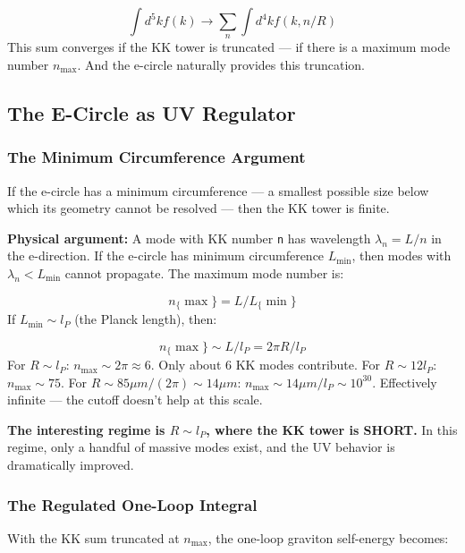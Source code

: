 \documentclass[aps,prd,preprint,superscriptaddress,longbibliography,floatfix]{revtex4-2}
\theoremstyle{remark}
\begin{document}
\begin{equation}
    \int d^{5}k f(k) \to \sum_n \int d^{4}k f(k, n/R)
\end{equation}
This sum converges if the KK tower is truncated --- if there is a maximum mode number $n_{\max}$. And the e-circle naturally provides this truncation.



\subsection{The E-Circle as UV Regulator}


\subsubsection{The Minimum Circumference Argument}

If the e-circle has a minimum circumference --- a smallest possible size below which its geometry cannot be resolved --- then the KK tower is finite.

\textbf{Physical argument:} A mode with KK number \texttt{n} has wavelength $\lambda_{n} = L/n$ in the e-direction. If the e-circle has minimum circumference $L_{\min}$, then modes with $\lambda_n < L_{\min}$ cannot propagate. The maximum mode number is:


\begin{equation}
    n_\{\max\} = L / L_\{\min\}
\end{equation}
If $L_{\min} \sim  l_P$ (the Planck length), then:


\begin{equation}
    n_\{\max\} \sim  L / l_P = 2\pi R / l_P
\end{equation}
For $R \sim  l_P$: $n_{\max} \sim  2\pi \approx 6$. Only about 6 KK modes contribute. For $R \sim  12 l_P$: $n_{\max} \sim  75$. For $R \sim  85 \mu m / (2\pi) \sim  14 \mu m$: $n_{\max} \sim  14 \mu m / l_P \sim  10^{30}$. Effectively infinite --- the cutoff doesn't help at this scale.

\textbf{The interesting regime is $R \sim  l_P$, where the KK tower is SHORT.} In this regime, only a handful of massive modes exist, and the UV behavior is dramatically improved.


\subsubsection{The Regulated One-Loop Integral}

With the KK sum truncated at $n_{\max}$, the one-loop graviton self-energy becomes:
\end{document}
